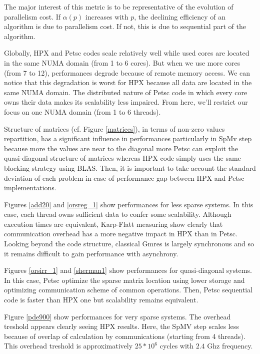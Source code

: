 \documentclass[smallextended]{svjour3}
\begin{document}
The major interest of this metric is to be representative of the evolution of parallelism cost. If $\alpha(p)$ increases with $p$, the declining efficiency of an algorithm is due to parallelism cost. If not, this is due to sequential part of the algorithm.\smallskip

Globally, HPX and Petsc codes scale relatively well while used cores are located in the same NUMA domain (from 1 to 6 cores). But when we use more cores (from 7 to 12), performances degrade because of remote memory access. We can notice that this degradation is worst for HPX because all data are located in the same NUMA domain. The distributed nature of Petsc code in which every core owns their data makes its scalability less impaired. From here, we'll restrict our focus on one NUMA domain (from 1 to 6 threads).\smallskip

Structure of matrices (cf. Figure \ref{matrices}), in terms of non-zero values repartition, has a significant influence in performances particularly in SpMv step because more the values are near to the diagonal more Petsc can exploit the quasi-diagonal structure of matrices whereas HPX code simply uses the same blocking strategy using BLAS. Then, it is important to take account the standard deviation of each problem in case of performance gap between HPX and Petsc implementations.\smallskip     

Figures \ref{add20} and \ref{orsreg_1} show performances for less sparse systems. In this case, each thread owns sufficient data to confer some scalability. Although execution times are equivalent, Karp-Flatt measuring show clearly that communication overhead has a more negative impact in HPX than in Petsc. Looking beyond the code structure, classical Gmres is largely synchronous and so it remains difficult to gain performance with asynchrony.\smallskip

Figures \ref{orsirr_1} and \ref{sherman1} show performances for quasi-diagonal systems. In this case, Petsc optimize the sparse matrix location using lower storage and optimizing communication scheme of common operations. Then, Petsc sequential code is faster than HPX one but scalability remains equivalent.\smallskip

Figure \ref{pde900} show performances for very sparse systems. The overhead treshold appears clearly seeing HPX results. Here, the SpMV step scales less because of overlap of calculation by communications (starting from 4 threads). This overhead treshold is approximatively $25*10^{6}$ cycles with $2.4$ Ghz frequency.
\end{document}
